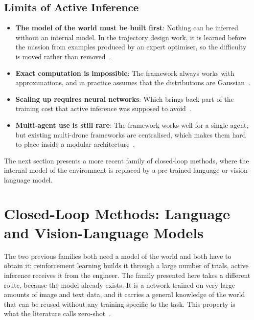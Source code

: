 \subsection{Limits of Active Inference}%
\label{subsec:nav:aif-limits}

\begin{itemize}[itemsep=0.5em]
    \item \textbf{The model of the world must be built first}: Nothing can be
          inferred without an internal model. In the trajectory design work, it
          is learned before the mission from examples produced by an expert
          optimiser, so the difficulty is moved rather than
          removed~\cite{krayani2023goal, krayani2026bayesian}.
    \item \textbf{Exact computation is impossible}: The framework always works
          with approximations, and in practice assumes that the distributions are
          Gaussian~\cite{ji2024integration}.
    \item \textbf{Scaling up requires neural networks}: Which brings back part of
          the training cost that active inference was supposed to
          avoid~\cite{ding2024external}.
    \item \textbf{Multi-agent use is still rare}: The framework works well for a
          single agent, but existing multi-drone frameworks are centralised,
          which makes them hard to place inside a modular
          architecture~\cite{wang2026bridging}.
\end{itemize}

The next section presents a more recent family of closed-loop methods, where the
internal model of the environment is replaced by a pre-trained language or
vision-language model.
\section{Closed-Loop Methods: Language and Vision-Language Models}%
\label{sec:nav:genai}

The two previous families both need a model of the world and both have to obtain
it: reinforcement learning builds it through a large number of trials, active
inference receives it from the engineer. The family presented here takes a
different route, because the model already exists. It is a network trained on
very large amounts of image and text data, and it carries a general knowledge of
the world that can be reused without any training specific to the task. This
property is what the literature calls zero-shot~\cite{radford2021learning}.

